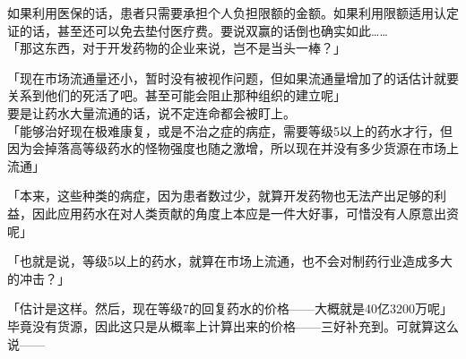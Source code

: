 如果利用医保的话，患者只需要承担个人负担限额的金额。如果利用限额适用认定证的话，甚至还可以免去垫付医疗费。要说双赢的话倒也确实如此……\\

「那这东西，对于开发药物的企业来说，岂不是当头一棒？」

「现在市场流通量还小，暂时没有被视作问题，但如果流通量增加了的话估计就要关系到他们的死活了吧。甚至可能会阻止那种组织的建立呢」\\

要是让药水大量流通的话，说不定连命都会被盯上。\\

「能够治好现在极难康复，或是不治之症的病症，需要等级5以上的药水才行，但因为会掉落高等级药水的怪物强度也随之激增，所以现在并没有多少货源在市场上流通」

「本来，这些种类的病症，因为患者数过少，就算开发药物也无法产出足够的利益，因此应用药水在对人类贡献的角度上本应是一件大好事，可惜没有人原意出资呢」

「也就是说，等级5以上的药水，就算在市场上流通，也不会对制药行业造成多大的冲击？」

「估计是这样。然后，现在等级7的回复药水的价格——大概就是40亿3200万呢」\\

毕竟没有货源，因此这只是从概率上计算出来的价格——三好补充到。可就算这么说——\\

